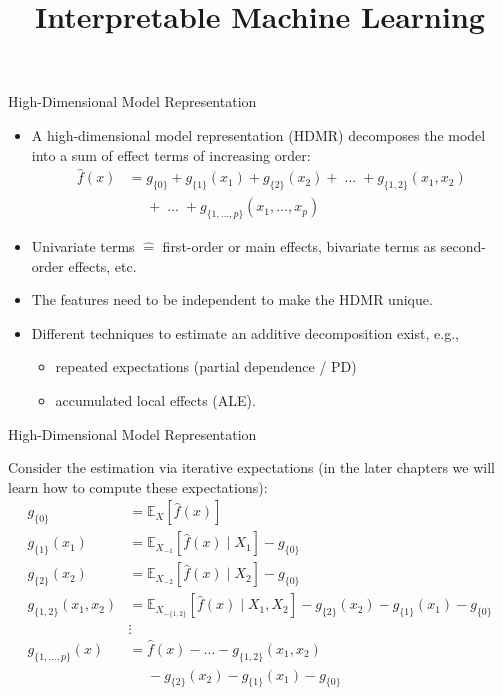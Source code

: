 \documentclass[11pt,compress,t,notes=noshow, aspectratio=169, xcolor=table]{beamer}
\title{Interpretable Machine Learning}
\date{}
\begin{document}
\newcommand{\titlefigure}{figure/open_blackbox}
\newcommand{\learninggoals}{
\item What are additive decomposition of prediction functions?
\item Why are they useful?
\item How do we obtain them?}

 
\begin{frame}{High-Dimensional Model Representation}

\begin{itemize}
\itemsep1em
\item
A high-dimensional model representation (HDMR) decomposes the model into a sum of effect terms of increasing order:
\begin{align*}
\hat{f}(x) &= g_{\{0\}} + g_{\{1\}}(x_1) + g_{\{2\}}(x_2) + \;\dots\; + g_{\{1, 2\}}(x_1, x_2) \\
&\phantom{{}={}} + \;\dots\; + g_{\{1,\ldots,p\}}(x_1, \ldots,x_p)
\end{align*}
\item Univariate terms $\hat = $ first-order or main effects, bivariate terms as second-order effects, etc.
\item The features need to be independent to make the HDMR unique.
\item Different techniques to estimate an additive decomposition exist, e.g., 
		\begin{itemize}
			\item repeated expectations (partial dependence / PD) 
			\item  accumulated local effects (ALE).
		\end{itemize}
\end{itemize}
\end{frame}

\begin{frame}{High-Dimensional Model Representation}

Consider the estimation via iterative expectations (in the later chapters we will learn how to compute these expectations):
\begin{align*}
 g_{\{0\}} &= \mathbb{E}_X\left[\widehat{f}(x)\right] \\
 g_{\{1\}}(x_1) &= \mathbb{E}_{X_{-1}}\left[\widehat{f}(x) \; \vert  \; X_1 \right] - g_{\{0\}} \\
 g_{\{2\}}(x_2) &= \mathbb{E}_{X_{-2}}\left[\widehat{f}(x) \; \vert  \; X_2 \right] - g_{\{0\}} \\
 g_{\{1, 2\}}(x_1, x_2) &= \mathbb{E}_{X_{-\{1,2\}}}\left[\widehat{f}(x) \; \vert \; X_1, X_2 \right] - g_{\{2\}}(x_2) - g_{\{1\}}(x_1) - g_{\{0\}}\\
 &\vdots \\
 g_{\{1, \dots, p\}}(x) &= \widehat{f}(x) - \dots - g_{\{1, 2\}}(x_1, x_2) \\
 &\phantom{{}={}} - g_{\{2\}}(x_2) - g_{\{1\}}(x_1) - g_{\{0\}}\\
\end{align*}

\end{frame}
\end{document}
